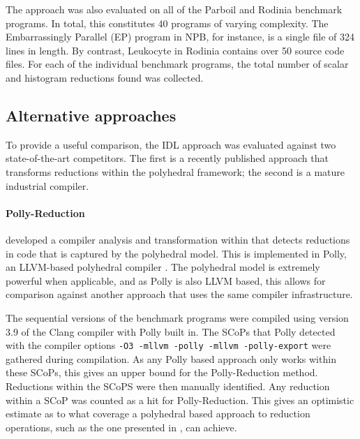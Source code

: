     The approach was also evaluated on all of the Parboil \citep{Stratton2018}
    and Rodinia \citep{Che2009Rodinia} benchmark programs.
    In total, this constitutes 40 programs of varying complexity.
    The Embarrassingly Parallel (EP) program in NPB, for instance, is a single
    file of 324 lines in length.
    By contrast, Leukocyte in Rodinia contains over 50 source code files.
    For each of the individual benchmark programs, the total number of scalar
    and histogram reductions found was collected.

\subsection{Alternative approaches}

    To provide a useful comparison, the IDL approach was evaluated against two
    state-of-the-art competitors.
    The first is a recently published approach that transforms reductions within
    the polyhedral framework; the second is a mature industrial compiler.

\paragraph*{Polly-Reduction}

    \citet{Doerfert2015Polly} developed a compiler analysis and transformation
    within that detects reductions in code that is captured by the
    polyhedral model.
    This is implemented in Polly, an LLVM-based polyhedral compiler
    \citep{Lengauer2012Polly}.
    The polyhedral model is extremely powerful when applicable, and as Polly is
    also LLVM based, this allows for comparison against another approach that
    uses the same compiler infrastructure.

    The sequential versions of the benchmark programs were compiled using
    version 3.9 of the Clang compiler with Polly built in.
    The SCoPs that Polly detected with the compiler options \texttt{-O3
    -mllvm -polly -mllvm -polly-export} were gathered during compilation.
    As any Polly based approach only works within these SCoPs, this gives an
    upper bound for the Polly-Reduction method.
    Reductions within the SCoPS were then manually identified.
    Any reduction within a SCoP was counted as a hit for Polly-Reduction.
    This gives an optimistic estimate as to what coverage a polyhedral based
    approach to reduction operations, such as the one presented in
    \citet{Doerfert2015Polly}, can achieve.

